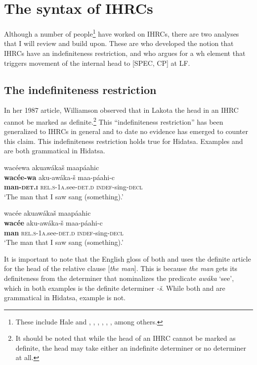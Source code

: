 \documentclass[output=paper]{LSP/langsci}
\begin{document}
\section{The syntax of IHRCs} 

Although a number of people\footnote{These include Hale and \citet{Platero1974}, \citet{Gorbet1976}, \citet{Faconnier1979}, \citealt{Cole1987}, \citet{Culy1990}, \citet{Kayne1994} \citet{Bianchi1999}, \citet{Citko2001} among others.} have worked on IHRCs, there are two analyses that I will review and build upon. These are \citet{Williamson1987} who developed the notion that IHRCs have an indefiniteness restriction, and \citet{Culy1990} who argues for a wh element that triggers movement of the internal head to [SPEC, CP] at LF.

\subsection{The indefiniteness restriction} 

In her 1987 article, Williamson observed that in Lakota the head in an IHRC cannot be marked as definite.\footnote{It should be noted that while the head of an IHRC cannot be marked as definite, the head may take either an indefinite determiner or no determiner at all.} This ``indefiniteness restriction'' has been generalized to IHRCs in general and to date no evidence has emerged to counter this claim. This indefiniteness restriction holds true for Hidatsa.  Examples  and  are both grammatical in Hidatsa.

\ea  \label{boyle13}
\glll wac\'eewa akuaw\'aka\v{s} maap\'aahic\\
\textbf{wac\'ee-wa}     aku-aw\'aka-\v{s}       maa-p\'aahi-c\\
\textbf{man-\textsc{det.i}} \textsc{rel.s-1a}.see-\textsc{det.d} \textsc{indef}-sing-\textsc{decl}\\ 
\trans `The man that I saw sang (something).' 
\z

\ea \label{boyle14}
\glll wac\'ee akuaw\'aka\v{s} maap\'aahic\\
\textbf{wac\'ee}  aku-aw\'aka-\v{s} maa-p\'aahi-c\\
\textbf{man} \textsc{rel.s-1a}.see-\textsc{det.d} \textsc{indef}-sing-\textsc{decl}\\
\trans `The man that I saw sang (something).' 
\z

It is important to note that the English gloss of both  and  uses the definite article for the head of the relative clause [\textit{the man}]. This is because \textit{the man} gets its definiteness from the determiner that nominalizes the predicate \textit{aw\'aka} `see', which in both examples is the definite determiner \textit{-\v{s}}. While both  and  are grammatical in Hidatsa, example  is not.
\end{document}
